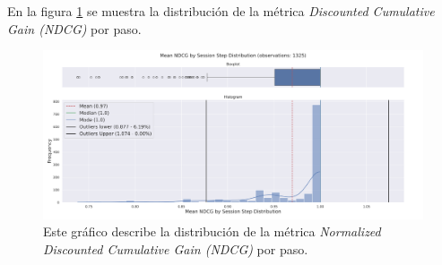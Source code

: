 \documentclass[11pt,a4paper,twoside]{thesis}
\begin{document}
\clearpage


En la figura \ref{fig:llama3-mean_ndcg_by_session_step_distribution} se muestra la distribución de la métrica \textit{ Discounted Cumulative Gain (NDCG)} por paso.

\begin{figure}[H]
	\centering
	\includegraphics[width=15cm]{./images/llama3/mean_ndcg_by_session_step_distribution.png}
	\caption{Este gráfico describe la distribución de la métrica \textit{Normalized Discounted Cumulative Gain (NDCG)}  por paso.
	}
	\label{fig:llama3-mean_ndcg_by_session_step_distribution}
\end{figure}
\end{document}
